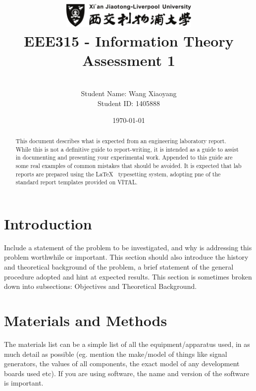 \documentclass[11pt, a4paper]{article}
\title{\includegraphics[width=0.5\textwidth]{xjtlu_logo_bw}
	\vspace{6mm}
        \\EEE315 - Information Theory
\\Assessment 1}          %
\author{\\Student Name: Wang Xiaoyang
\\Student ID: 1405888}
\date{\tiny{\today}}
\begin{document}
\begin{titlepage}
\maketitle
{} %

\begin{abstract}
This document describes what is expected from an engineering laboratory report. While this is not a definitive guide to report-writing, it is intended as a guide to assist in documenting and presenting your experimental work. Appended to this guide are some real examples of common mistakes that should be avoided. It is expected that lab reports are prepared using the \LaTeX~ typesetting system, adopting pne of the standard report templates provided on VITAL. 
\end{abstract}

\tableofcontents
\end{titlepage}


\section{Introduction}


Include a statement of the problem to be investigated, and why is addressing this problem worthwhile or important. This section should also introduce the history and theoretical background of the problem, a brief statement of the general procedure adopted and hint at expected results. This section is sometimes broken down into subsections: Objectives and Theoretical Background.

\section{Materials and Methods}

The materials list can be a simple list of all the equipment/apparatus used, in as much detail as possible (eg. mention the make/model of things like signal generators, the values of all components, the exact model of any development boards used etc). If you are using software, the name and version of the software is important.
\end{document}

